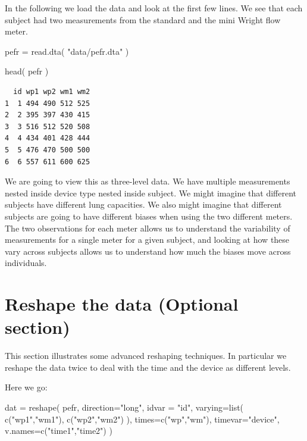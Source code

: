 \documentclass[
  letterpaper,
  DIV=11,
  numbers=noendperiod]{scrreprt}
\newenvironment{Shaded}{}{}
\newcommand{\AttributeTok}[1]{\textcolor[rgb]{0.49,0.56,0.16}{#1}}
\newcommand{\FunctionTok}[1]{\textcolor[rgb]{0.02,0.16,0.49}{#1}}
\newcommand{\NormalTok}[1]{#1}
\newcommand{\OtherTok}[1]{\textcolor[rgb]{0.00,0.44,0.13}{#1}}
\newcommand{\StringTok}[1]{\textcolor[rgb]{0.25,0.44,0.63}{#1}}
\begin{document}
In the following we load the data and look at the first few lines. We
see that each subject had two measurements from the standard and the
mini Wright flow meter.

\begin{Shaded}
\begin{Highlighting}[]
\NormalTok{pefr }\OtherTok{=} \FunctionTok{read.dta}\NormalTok{( }\StringTok{"data/pefr.dta"}\NormalTok{ )}

\FunctionTok{head}\NormalTok{( pefr )}
\end{Highlighting}
\end{Shaded}

\begin{verbatim}
  id wp1 wp2 wm1 wm2
1  1 494 490 512 525
2  2 395 397 430 415
3  3 516 512 520 508
4  4 434 401 428 444
5  5 476 470 500 500
6  6 557 611 600 625
\end{verbatim}

We are going to view this as three-level data. We have multiple
measurements nested inside device type nested inside subject. We might
imagine that different subjects have different lung capacities. We also
might imagine that different subjects are going to have different biases
when using the two different meters. The two observations for each meter
allows us to understand the variability of measurements for a single
meter for a given subject, and looking at how these vary across subjects
allows us to understand how much the biases move across individuals.

\section{Reshape the data (Optional
section)}\label{reshape-the-data-optional-section}

This section illustrates some advanced reshaping techniques. In
particular we reshape the data twice to deal with the time and the
device as different levels.

Here we go:

\begin{Shaded}
\begin{Highlighting}[]
\NormalTok{dat }\OtherTok{=} \FunctionTok{reshape}\NormalTok{( pefr, }\AttributeTok{direction=}\StringTok{"long"}\NormalTok{, }\AttributeTok{idvar =} \StringTok{"id"}\NormalTok{, }
               \AttributeTok{varying=}\FunctionTok{list}\NormalTok{( }\FunctionTok{c}\NormalTok{(}\StringTok{"wp1"}\NormalTok{,}\StringTok{"wm1"}\NormalTok{), }\FunctionTok{c}\NormalTok{(}\StringTok{"wp2"}\NormalTok{,}\StringTok{"wm2"}\NormalTok{) ),}
               \AttributeTok{times=}\FunctionTok{c}\NormalTok{(}\StringTok{"wp"}\NormalTok{,}\StringTok{"wm"}\NormalTok{),}
               \AttributeTok{timevar=}\StringTok{"device"}\NormalTok{,}
               \AttributeTok{v.names=}\FunctionTok{c}\NormalTok{(}\StringTok{"time1"}\NormalTok{,}\StringTok{"time2"}\NormalTok{) )}
\end{Highlighting}
\end{Shaded}
\end{document}
